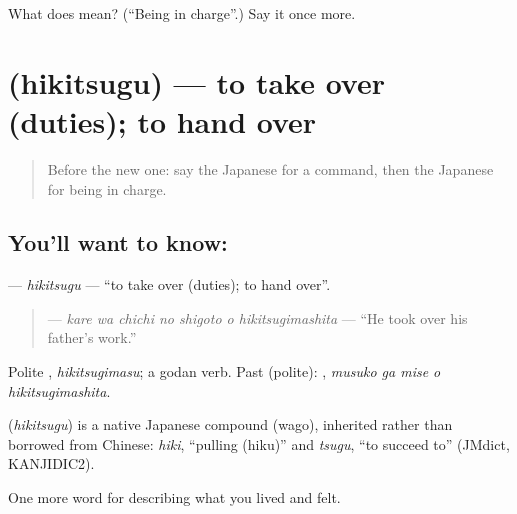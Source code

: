 \begin{tcolorbox}[breakable,colback=teal!4,colframe=teal!35!black,title={Before you move on}]
What does  mean? (\textquotedblleft{}Being in charge\textquotedblright{}.) Say it once more.
\end{tcolorbox}
\section[\texorpdfstring{\ja{ひきつぐ} (hikitsugu)}{ひきつぐ (hikitsugu)}]{ (hikitsugu) — to take over (duties); to hand over}

\label{lesson:JA-C455-hikitsugu}



\begin{quote}
Before the new one: say the Japanese for a command, then the Japanese for being in charge.
\end{quote}

\subsection*{You'll want to know: }
\textbf{} — \emph{hikitsugu} — \textquotedblleft{}to take over (duties); to hand over\textquotedblright{}.

\begin{quote}
\textbf{   } — \emph{kare wa chichi no shigoto o hikitsugimashita} — \textquotedblleft{}He took over his father's work.\textquotedblright{}
\end{quote}

Polite \textbf{}, \emph{hikitsugimasu}; a godan verb. Past (polite): \textbf{  }, \emph{musuko ga mise o hikitsugimashita}.

\begin{cousinweb}
\textbf{} (\emph{hikitsugu}) is a native Japanese compound (wago), inherited rather than borrowed from Chinese: \emph{hiki}, \textquotedblleft{}pulling (hiku)\textquotedblright{} and \emph{tsugu}, \textquotedblleft{}to succeed to\textquotedblright{} (JMdict, KANJIDIC2).
\end{cousinweb}

\begin{grammarlens}[title={What you've built}]
One more word for describing what you lived and felt.
\end{grammarlens}

